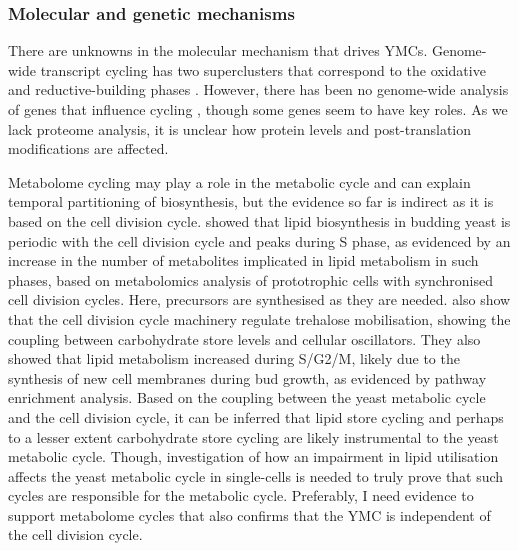 \subsubsection{Molecular and genetic mechanisms}
\label{subsubsec:intro-ymc-unresolved-molecular}

There are unknowns in the molecular mechanism that drives YMCs.
Genome-wide transcript cycling has two superclusters that correspond to the oxidative and reductive-building phases \citep{machneYinYangYeast2012}.
However, there has been no genome-wide analysis of genes that influence cycling \citep{mellorMolecularBasisMetabolic2016}, though some genes seem to have key roles.
As we lack proteome analysis, it is unclear how protein levels and post-translation modifications are affected.


Metabolome cycling may play a role in the metabolic cycle and can explain temporal partitioning of biosynthesis, but the evidence so far is indirect as it is based on the cell division cycle.
\textcite{campbellBuildingBlocksAre2020} showed that lipid biosynthesis in budding yeast is periodic with the cell division cycle and peaks during S phase, as evidenced by an increase in the number of metabolites implicated in lipid metabolism in such phases, based on metabolomics analysis of prototrophic cells with synchronised cell division cycles.
Here, precursors are synthesised as they are needed.
\citet{ewaldYeastCyclinDependentKinase2016} also show that the cell division cycle machinery regulate trehalose mobilisation, showing the coupling between carbohydrate store levels and cellular oscillators.
They also showed that lipid metabolism increased during S/G2/M, likely due to the synthesis of new cell membranes during bud growth, as evidenced by pathway enrichment analysis.
Based on the coupling between the yeast metabolic cycle and the cell division cycle, it can be inferred that lipid store cycling and perhaps to a lesser extent carbohydrate store cycling are likely instrumental to the yeast metabolic cycle.
Though, investigation of how an impairment in lipid utilisation affects the yeast metabolic cycle in single-cells is needed to truly prove that such cycles are responsible for the metabolic cycle.
Preferably, I need evidence to support metabolome cycles that also confirms that the YMC is independent of the cell division cycle.


